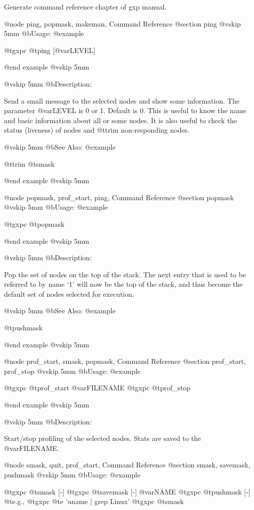   Generate command reference chapter of gxp manual.

@node ping, popmask, makeman, Command Reference
@section ping
@vskip 5mm
@b{Usage:}
@example

  @t{gxpc} @t{ping} [@var{LEVEL}]

@end example
@vskip 5mm

@vskip 5mm
@b{Description:}


  Send a small message to the selected nodes and show some
information. The parameter @var{LEVEL} is 0 or 1. Default is 0.
This is useful to know the name and basic information about
all or some nodes. It is also useful to check the status (liveness)
of nodes and @t{trim} non-responding nodes.

@vskip 5mm
@b{See Also:}
@example

  @t{trim} @t{smask}

@end example
@vskip 5mm

@node popmask, prof_start, ping, Command Reference
@section popmask
@vskip 5mm
@b{Usage:}
@example

  @t{gxpc} @t{popmask}

@end example
@vskip 5mm

@vskip 5mm
@b{Description:}


  Pop the set of nodes on the top of the stack. The next entry
that is used to be referred to by name `1' will now be the top
of the stack, and thus become the default set of nodes selected
for execution.

@vskip 5mm
@b{See Also:}
@example

  @t{pushmask}

@end example
@vskip 5mm

@node prof_start, smask, popmask, Command Reference
@section prof_start, prof_stop
@vskip 5mm
@b{Usage:}
@example

  @t{gxpc} @t{prof_start} @var{FILENAME}
  @t{gxpc} @t{prof_stop}

@end example
@vskip 5mm

@vskip 5mm
@b{Description:}


  Start/stop profiling of the selected nodes. Stats are saved to
the @var{FILENAME}.

@node smask, quit, prof_start, Command Reference
@section smask, savemask, pushmask
@vskip 5mm
@b{Usage:}
@example

  @t{gxpc} @t{smask}    [-]
  @t{gxpc} @t{savemask} [-] @var{NAME}
  @t{gxpc} @t{pushmask} [-]
  @t{e}.g.,
  @t{gxpc}  @t{e}  'uname | grep Linux'
  @t{gxpc}  @t{smask}


